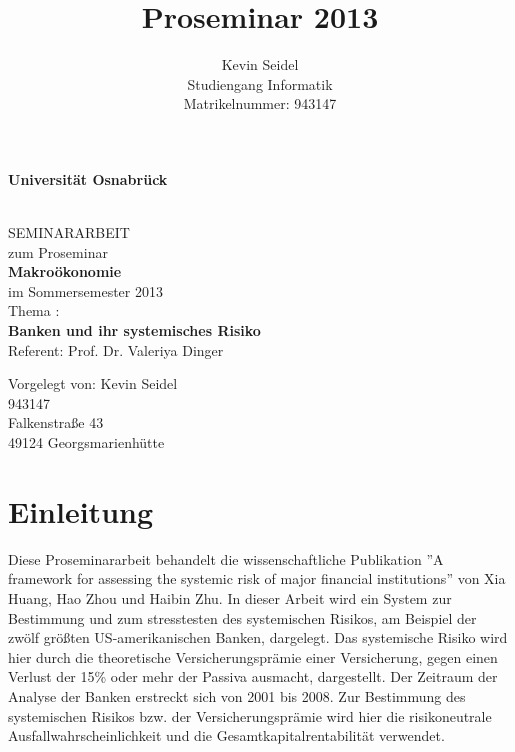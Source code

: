 \documentclass[a4paper,12pt]{scrartcl}
\title{Proseminar 2013}
\author{Kevin Seidel \\ Studiengang Informatik \\ Matrikelnummer: 943147}
\begin{document}
\begin{titlepage}
\begin{center}
\vspace*{1.5cm}
\begin{Large}
\textbf{Universität Osnabrück} \\[1cm]
\end{Large}

\noindent\hrulefill
\\[1.5cm]
SEMINARARBEIT \\[1cm]
zum Proseminar \\[1cm]
\textbf{Makroökonomie} \\[1cm]
im Sommersemester 2013 \\[1.5cm]
Thema : \\[1cm]
\textbf{Banken und ihr systemisches Risiko} \\[1cm]
Referent: Prof. Dr. Valeriya Dinger \\[2cm]

\end{center}
\begin{flushleft}
Vorgelegt von: \hfill Kevin Seidel \\
\hfill 943147 \\
\hfill Falkenstraße 43 \\
\hfill 49124 Georgsmarienhütte
\end{flushleft}

\end{titlepage}

\newpage

\setcounter{page}{2}
\tableofcontents



\newpage
{} 
\setcounter{page}{1} 


\section{Einleitung}
Diese Proseminararbeit behandelt die wissenschaftliche Publikation ''A framework for assessing the systemic risk of major financial institutions'' von Xia Huang, Hao Zhou und Haibin Zhu. In dieser Arbeit wird ein System zur Bestimmung und zum stresstesten des systemischen Risikos, am Beispiel der zwölf größten US-amerikanischen Banken, dargelegt. Das systemische Risiko wird hier durch die theoretische Versicherungsprämie einer Versicherung, gegen einen Verlust der 15\% oder mehr der Passiva ausmacht, dargestellt. Der Zeitraum der Analyse der Banken erstreckt sich von 2001 bis 2008. Zur Bestimmung des systemischen Risikos bzw. der Versicherungsprämie wird hier die risikoneutrale Ausfallwahrscheinlichkeit und die Gesamtkapitalrentabilität verwendet.
\newpage
\end{document}
